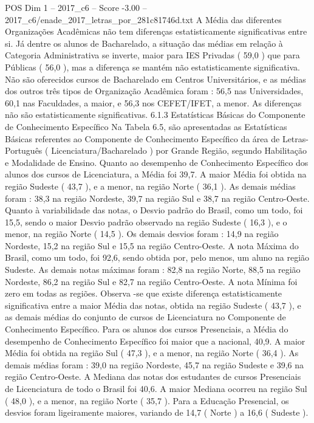 \begin{textsample}{POS Dim 1 – 2017\_c6 – Score -3.00 – 2017\_c6/enade\_2017\_letras\_por\_281c81746d.txt}
A Média das diferentes Organizações Acadêmicas não tem diferenças estatisticamente significativas entre si.
Já dentre os alunos de Bacharelado, a situação das médias em relação à Categoria Administrativa se inverte, maior para IES Privadas ( 59,0 ) que para Públicas ( 56,0 ), mas a diferença se mantém não estatisticamente significativa.
Não são oferecidos cursos de Bacharelado em Centros Universitários, e as médias dos outros três tipos de Organização Acadêmica foram : 56,5 nas Universidades, 60,1 nas Faculdades, a maior, e 56,3 nos CEFET/IFET, a menor.
As diferenças não são estatisticamente significativas. 6.1.3 Estatísticas Básicas do Componente de Conhecimento Específico Na Tabela 6.5, são apresentadas as Estatísticas Básicas referentes ao Componente de Conhecimento Específico da área de Letras-Português ( Licenciatura/Bacharelado ) por Grande Região, segundo Habilitação e Modalidade de Ensino.
Quanto ao desempenho de Conhecimento Específico dos alunos dos cursos de Licenciatura, a Média foi 39,7.
A maior Média foi obtida na região Sudeste ( 43,7 ), e a menor, na região Norte ( 36,1 ).
As demais médias foram : 38,3 na região Nordeste, 39,7 na região Sul e 38,7 na região Centro-Oeste.
Quanto à variabilidade das notas, o Desvio padrão do Brasil, como um todo, foi 15,5, sendo o maior Desvio padrão observado na região Sudeste ( 16,3 ), e o menor, na região Norte ( 14,5 ).
Os demais desvios foram : 14,9 na região Nordeste, 15,2 na região Sul e 15,5 na região Centro-Oeste.
A nota Máxima do Brasil, como um todo, foi 92,6, sendo obtida por, pelo menos, um aluno na região Sudeste.
As demais notas máximas foram : 82,8 na região Norte, 88,5 na região Nordeste, 86,2 na região Sul e 82,7 na região Centro-Oeste.
A nota Mínima foi zero em todas as regiões.
Observa -se que existe diferença estatisticamente significativa entre a maior Média das notas, obtida na região Sudeste ( 43,7 ), e as demais médias do conjunto de cursos de Licenciatura no Componente de Conhecimento Específico.
Para os alunos dos cursos Presenciais, a Média do desempenho de Conhecimento Específico foi maior que a nacional, 40,9.
A maior Média foi obtida na região Sul ( 47,3 ), e a menor, na região Norte ( 36,4 ).
As demais médias foram : 39,0 na região Nordeste, 45,7 na região Sudeste e 39,6 na região Centro-Oeste.
A Mediana das notas dos estudantes de cursos Presenciais de Licenciatura de todo o Brasil foi 40,6.
A maior Mediana ocorreu na região Sul ( 48,0 ), e a menor, na região Norte ( 35,7 ).
Para a Educação Presencial, os desvios foram ligeiramente maiores, variando de 14,7 ( Norte ) a 16,6 ( Sudeste ).

\end{textsample}
